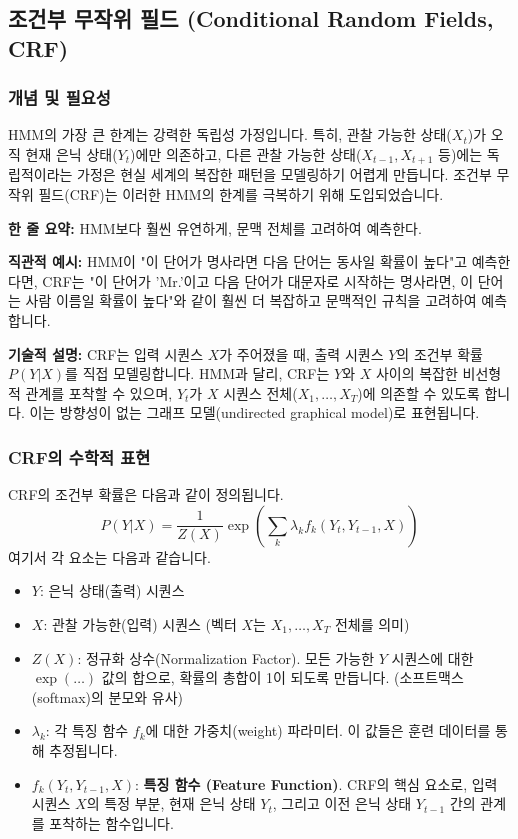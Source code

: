 \documentclass[11pt,a4paper]{article}
\theoremstyle{definition}
\begin{document}
\subsection{조건부 무작위 필드 (Conditional Random Fields, CRF)}

\subsubsection{개념 및 필요성}
HMM의 가장 큰 한계는 강력한 독립성 가정입니다. 특히, 관찰 가능한 상태($X_t$)가 오직 현재 은닉 상태($Y_t$)에만 의존하고, 다른 관찰 가능한 상태($X_{t-1}, X_{t+1}$ 등)에는 독립적이라는 가정은 현실 세계의 복잡한 패턴을 모델링하기 어렵게 만듭니다. 조건부 무작위 필드(CRF)는 이러한 HMM의 한계를 극복하기 위해 도입되었습니다.

\begin{tcolorbox}[conceptbox, title=조건부 무작위 필드 (CRF)의 핵심 아이디어]
\textbf{한 줄 요약:} HMM보다 훨씬 유연하게, 문맥 전체를 고려하여 예측한다.

\textbf{직관적 예시:} HMM이 "이 단어가 명사라면 다음 단어는 동사일 확률이 높다"고 예측한다면, CRF는 "이 단어가 'Mr.'이고 다음 단어가 대문자로 시작하는 명사라면, 이 단어는 사람 이름일 확률이 높다"와 같이 훨씬 더 복잡하고 문맥적인 규칙을 고려하여 예측합니다.

\textbf{기술적 설명:} CRF는 입력 시퀀스 $X$가 주어졌을 때, 출력 시퀀스 $Y$의 조건부 확률 $P(Y|X)$를 직접 모델링합니다. HMM과 달리, CRF는 $Y$와 $X$ 사이의 복잡한 비선형적 관계를 포착할 수 있으며, $Y_t$가 $X$ 시퀀스 전체($X_1, \dots, X_T$)에 의존할 수 있도록 합니다. 이는 방향성이 없는 그래프 모델(undirected graphical model)로 표현됩니다.
\end{tcolorbox}

\subsubsection{CRF의 수학적 표현}
CRF의 조건부 확률은 다음과 같이 정의됩니다.
\[ P(Y|X) = \frac{1}{Z(X)} \exp\left(\sum_k \lambda_k f_k(Y_t, Y_{t-1}, X)\right) \]
여기서 각 요소는 다음과 같습니다.
\begin{itemize}
    \item $Y$: 은닉 상태(출력) 시퀀스
    \item $X$: 관찰 가능한(입력) 시퀀스 (벡터 $X$는 $X_1, \dots, X_T$ 전체를 의미)
    \item $Z(X)$: 정규화 상수(Normalization Factor). 모든 가능한 $Y$ 시퀀스에 대한 $\exp(\dots)$ 값의 합으로, 확률의 총합이 1이 되도록 만듭니다. (소프트맥스(softmax)의 분모와 유사)
    \item $\lambda_k$: 각 특징 함수 $f_k$에 대한 가중치(weight) 파라미터. 이 값들은 훈련 데이터를 통해 추정됩니다.
    \item $f_k(Y_t, Y_{t-1}, X)$: \textbf{특징 함수 (Feature Function)}. CRF의 핵심 요소로, 입력 시퀀스 $X$의 특정 부분, 현재 은닉 상태 $Y_t$, 그리고 이전 은닉 상태 $Y_{t-1}$ 간의 관계를 포착하는 함수입니다.
\end{itemize}
\end{document}

